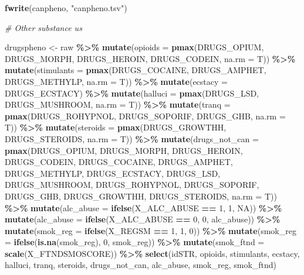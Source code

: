 \documentclass[
]{article}
\newenvironment{Shaded}{\begin{snugshade}}{\end{snugshade}}
\newcommand{\AttributeTok}[1]{\textcolor[rgb]{0.13,0.29,0.53}{#1}}
\newcommand{\CommentTok}[1]{\textcolor[rgb]{0.56,0.35,0.01}{\textit{#1}}}
\newcommand{\ConstantTok}[1]{\textcolor[rgb]{0.56,0.35,0.01}{#1}}
\newcommand{\DecValTok}[1]{\textcolor[rgb]{0.00,0.00,0.81}{#1}}
\newcommand{\FunctionTok}[1]{\textcolor[rgb]{0.13,0.29,0.53}{\textbf{#1}}}
\newcommand{\NormalTok}[1]{#1}
\newcommand{\OtherTok}[1]{\textcolor[rgb]{0.56,0.35,0.01}{#1}}
\newcommand{\SpecialCharTok}[1]{\textcolor[rgb]{0.81,0.36,0.00}{\textbf{#1}}}
\newcommand{\StringTok}[1]{\textcolor[rgb]{0.31,0.60,0.02}{#1}}
\begin{document}
\begin{Shaded}
\begin{Highlighting}[]
\FunctionTok{fwrite}\NormalTok{(canpheno, }\StringTok{"canpheno.tsv"}\NormalTok{)}


\CommentTok{\# Other substance us}

\NormalTok{drugspheno }\OtherTok{\textless{}{-}}\NormalTok{ raw }\SpecialCharTok{\%\textgreater{}\%} 
  \FunctionTok{mutate}\NormalTok{(}\AttributeTok{opioids =} \FunctionTok{pmax}\NormalTok{(DRUGS\_OPIUM, DRUGS\_MORPH, DRUGS\_HEROIN, DRUGS\_CODEIN, }\AttributeTok{na.rm =}\NormalTok{ T)) }\SpecialCharTok{\%\textgreater{}\%} 
  \FunctionTok{mutate}\NormalTok{(}\AttributeTok{stimulants =} \FunctionTok{pmax}\NormalTok{(DRUGS\_COCAINE, DRUGS\_AMPHET, DRUGS\_METHYLP, }\AttributeTok{na.rm =}\NormalTok{ T)) }\SpecialCharTok{\%\textgreater{}\%} 
  \FunctionTok{mutate}\NormalTok{(}\AttributeTok{ecstacy =}\NormalTok{ DRUGS\_ECSTACY) }\SpecialCharTok{\%\textgreater{}\%}
  \FunctionTok{mutate}\NormalTok{(}\AttributeTok{halluci =} \FunctionTok{pmax}\NormalTok{(DRUGS\_LSD, DRUGS\_MUSHROOM, }\AttributeTok{na.rm =}\NormalTok{ T)) }\SpecialCharTok{\%\textgreater{}\%}
  \FunctionTok{mutate}\NormalTok{(}\AttributeTok{tranq =} \FunctionTok{pmax}\NormalTok{(DRUGS\_ROHYPNOL, DRUGS\_SOPORIF, DRUGS\_GHB, }\AttributeTok{na.rm =}\NormalTok{ T)) }\SpecialCharTok{\%\textgreater{}\%}
  \FunctionTok{mutate}\NormalTok{(}\AttributeTok{steroids =} \FunctionTok{pmax}\NormalTok{(DRUGS\_GROWTHH, DRUGS\_STEROIDS, }\AttributeTok{na.rm =}\NormalTok{ T)) }\SpecialCharTok{\%\textgreater{}\%}
   \FunctionTok{mutate}\NormalTok{(}\AttributeTok{drugs\_not\_can =} \FunctionTok{pmax}\NormalTok{(DRUGS\_OPIUM, DRUGS\_MORPH, DRUGS\_HEROIN, DRUGS\_CODEIN, DRUGS\_COCAINE, DRUGS\_AMPHET, DRUGS\_METHYLP, DRUGS\_ECSTACY, DRUGS\_LSD, DRUGS\_MUSHROOM, DRUGS\_ROHYPNOL, DRUGS\_SOPORIF, DRUGS\_GHB, DRUGS\_GROWTHH, DRUGS\_STEROIDS, }\AttributeTok{na.rm =}\NormalTok{ T)) }\SpecialCharTok{\%\textgreater{}\%} 
  \FunctionTok{mutate}\NormalTok{(}\AttributeTok{alc\_abuse =} \FunctionTok{ifelse}\NormalTok{(X\_ALC\_ABUSE }\SpecialCharTok{==} \DecValTok{1}\NormalTok{, }\DecValTok{1}\NormalTok{, }\ConstantTok{NA}\NormalTok{)) }\SpecialCharTok{\%\textgreater{}\%} 
  \FunctionTok{mutate}\NormalTok{(}\AttributeTok{alc\_abuse =} \FunctionTok{ifelse}\NormalTok{(X\_ALC\_ABUSE }\SpecialCharTok{==} \DecValTok{0}\NormalTok{, }\DecValTok{0}\NormalTok{, alc\_abuse)) }\SpecialCharTok{\%\textgreater{}\%} 
  \FunctionTok{mutate}\NormalTok{(}\AttributeTok{smok\_reg =} \FunctionTok{ifelse}\NormalTok{(X\_REGSM }\SpecialCharTok{==} \DecValTok{1}\NormalTok{, }\DecValTok{1}\NormalTok{, }\DecValTok{0}\NormalTok{)) }\SpecialCharTok{\%\textgreater{}\%} 
  \FunctionTok{mutate}\NormalTok{(}\AttributeTok{smok\_reg =} \FunctionTok{ifelse}\NormalTok{(}\FunctionTok{is.na}\NormalTok{(smok\_reg), }\DecValTok{0}\NormalTok{, smok\_reg)) }\SpecialCharTok{\%\textgreater{}\%} 
   \FunctionTok{mutate}\NormalTok{(}\AttributeTok{smok\_ftnd =} \FunctionTok{scale}\NormalTok{(X\_FTNDSMOSCORE)) }\SpecialCharTok{\%\textgreater{}\%} 
  \FunctionTok{select}\NormalTok{(idSTR, opioids, stimulants, ecstacy, halluci, tranq, steroids, drugs\_not\_can, alc\_abuse, smok\_reg, smok\_ftnd)}
  


\end{Highlighting}
\end{Shaded}
\end{document}
